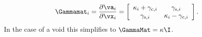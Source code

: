 \begin{equation}
  \Gammamat_i = \frac{\partial\va_i}{\partial\vx_i}
  = \left[\begin{array}{cc}
    \kappa_i + \gamma_{\mathrm{c},i} & \gamma_{\mathrm{s},i} \\
    \gamma_{\mathrm{s},i} & \kappa_i - \gamma_{\mathrm{c},i}
  \end{array}\right].
\end{equation}
In the case of a void this simplifies to $\GammaMat = \kappa \I$.
  
  